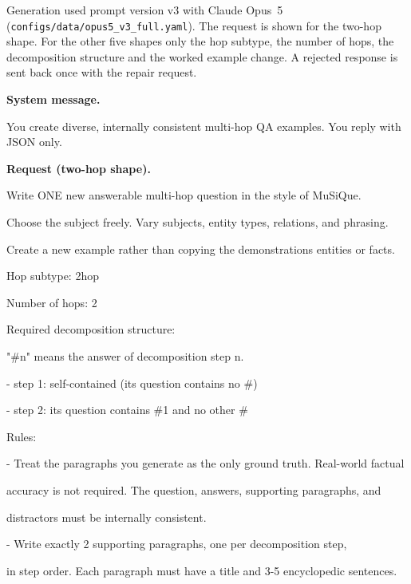 Generation used prompt version v3 with Claude Opus~5
(\texttt{configs/data/opus5\_v3\_full.yaml}). The request is shown for the
two-hop shape. For the other five shapes only the hop subtype, the number of
hops, the decomposition structure and the worked example change. A rejected
response is sent back once with the repair request.

\medskip\noindent\textbf{System message.}

\begin{promptbox}
You create diverse, internally consistent multi-hop QA examples. You reply with JSON only.\par
\end{promptbox}

\medskip\noindent\textbf{Request (two-hop shape).}

\begin{promptbox}
Write ONE new answerable multi-hop question in the style of MuSiQue.\par
\promptblank
Choose the subject freely. Vary subjects, entity types, relations, and phrasing.\par
Create a new example rather than copying the demonstration\textquotesingle{}s entities or facts.\par
\promptblank
Hop subtype: 2hop\par
Number of hops: 2\par
\promptblank
Required decomposition structure:\par
"\#n" means the answer of decomposition step n.\par
\hspace*{1em}- step 1: self-contained (its question contains no \#)\par
\hspace*{1em}- step 2: its question contains \#1 and no other \#\par
\promptblank
Rules:\par
- Treat the paragraphs you generate as the only ground truth. Real-world factual\par
\hspace*{1em}accuracy is not required. The question, answers, supporting paragraphs, and\par
\hspace*{1em}distractors must be internally consistent.\par
- Write exactly 2 supporting paragraphs, one per decomposition step,\par
\hspace*{1em}in step order. Each paragraph must have a title and 3-5 encyclopedic sentences.\par

\end{promptbox}
